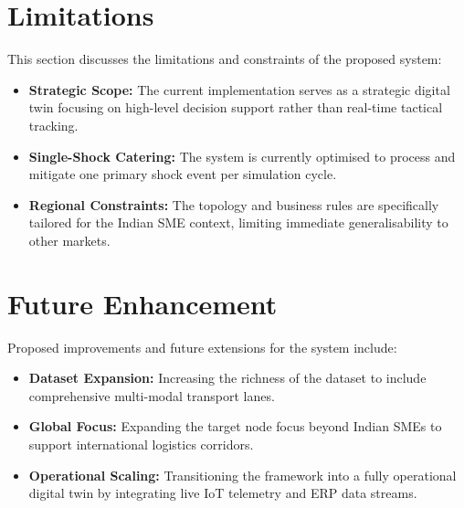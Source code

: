 \section[Limitations]{Limitations}
This section discusses the limitations and constraints of the proposed system:
\begin{itemize}
    \item \textbf{Strategic Scope:} The current implementation serves as a strategic digital twin focusing on high-level decision support rather than real-time tactical tracking.
    \item \textbf{Single-Shock Catering:} The system is currently optimised to process and mitigate one primary shock event per simulation cycle.
    \item \textbf{Regional Constraints:} The topology and business rules are specifically tailored for the Indian SME context, limiting immediate generalisability to other markets.
\end{itemize}

\section[Future Enhancement]{Future Enhancement}
Proposed improvements and future extensions for the system include:
\begin{itemize}
    \item \textbf{Dataset Expansion:} Increasing the richness of the dataset to include comprehensive multi-modal transport lanes.
    \item \textbf{Global Focus:} Expanding the target node focus beyond Indian SMEs to support international logistics corridors.
    \item \textbf{Operational Scaling:} Transitioning the framework into a fully operational digital twin by integrating live IoT telemetry and ERP data streams.
\end{itemize}
